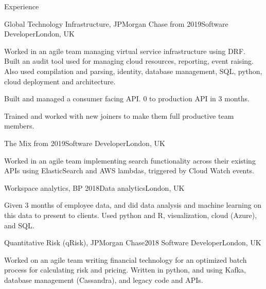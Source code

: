 \documentclass[10pt]{resume} %
\begin{document}
\begin{rSection}{Experience}


  \begin{rSubsection}{Global Technology Infrastructure, JPMorgan Chase}
    {from 2019}{Software Developer}{London, UK}
  \item Worked in an agile team managing virtual service infrastructure using
    DRF. Built an audit tool used for managing cloud resources, reporting, event
    raising. Also used compilation and parsing, identity, database management,
    SQL, python, cloud deployment and architecture.
  \item Built and managed a consumer facing API. 0 to production API in 3 months.
  \item Trained and worked with new joiners to make them full productive team
    members.
  \end{rSubsection}


  \begin{rSubsection}{The Mix}
    {from 2019}{Software Developer}{London, UK}
  \item Worked in an agile team implementing search functionality across their
    existing APIs using ElasticSearch and AWS lambdas, triggered by Cloud Watch
    events.
  \end{rSubsection}


  \begin{rSubsection}{Workspace analytics, BP}
    {2018}{Data analytics}{London, UK}
  \item Given 3 months of employee data, and did data analysis and machine
    learning on this data to present to clients. Used python and R,
    visualization, cloud (Azure), and SQL.
  \end{rSubsection}


  \begin{rSubsection}{Quantitative Risk (qRisk), JPMorgan Chase}{2018}
    {Software Developer}{London, UK}
    \item Worked on an agile team writing financial technology for an optimized
      batch process for calculating risk and pricing. Written in python, and
      using Kafka, database management (Cassandra), and legacy code and APIs.
  \end{rSubsection}


\end{rSection}
\end{document}
